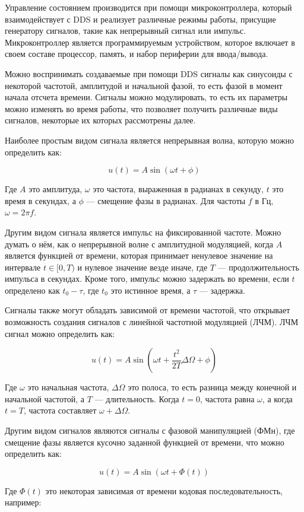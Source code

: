 \documentclass{report}
\begin{document}
Управление состоянием производится при помощи микроконтроллера, который взаимодействует с DDS и реализует различные режимы работы, присущие генератору сигналов, такие как непрерывный сигнал или импульс. Микроконтроллер является программируемым устройством, которое включает в своем составе процессор, память, и набор периферии для ввода/вывода.

Можно воспринимать создаваемые при помощи DDS сигналы как синусоиды с некоторой частотой, амплитудой и начальной фазой, то есть фазой в момент начала отсчета времени. Сигналы можно модулировать, то есть их параметры можно изменять во время работы, что позволяет получить различные виды сигналов, некоторые их которых рассмотрены далее.

Наиболее простым видом сигнала является непрерывная волна, которую можно определить как:

$$
u(t) = A \sin (\omega t + \phi)
$$

Где $A$ это амплитуда, $\omega$ это частота, выраженная в радианах в секунду, $t$ это время в секундах, а $\phi$ --- смещение фазы в радианах. Для частоты $f$ в Гц, $\omega = 2 \pi f$.

Другим видом сигнала является импульс на фиксированной частоте. Можно думать о нём, как о непрерывной волне с амплитудной модуляцией, когда $A$ является функцией от времени, которая принимает ненулевое значение на интервале $t \in [0, T)$ и нулевое значение везде иначе, где $T$ --- продолжительность импульса в секундах. Кроме того, импульс можно задержать во времени, если $t$ определено как $t_0 - \tau$, где $t_0$ это истинное время, а $\tau$ --- задержка.

Сигналы также могут обладать зависимой от времени частотой, что открывает возможность создания сигналов с линейной частотной модуляцией (ЛЧМ). ЛЧМ сигнал можно определить как:

$$
u(t) = A \sin (\omega t + \frac{t^2}{2T} \Delta \Omega + \phi)
$$

Где $\omega$ это начальная частота, $\Delta \Omega$ это полоса, то есть разница между конечной и начальной частотой, а $T$ --- длительность. Когда $t=0$, частота равна $\omega$, а когда $t=T$, частота составляет $\omega + \Delta \Omega$.

Другим видом сигналов являются сигналы с фазовой манипуляцией (ФМн), где смещение фазы является кусочно заданной функцией от времени, что можно определить как:

$$
u(t) = A \sin (\omega t + \Phi(t))
$$

Где $\Phi(t)$ это некоторая зависимая от времени кодовая последовательность, например:
\end{document}

